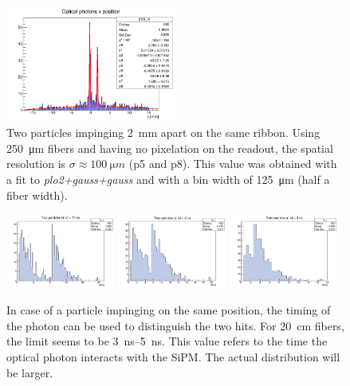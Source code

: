 \begin{refsection}
        \begin{figure}
            \centering
            \includegraphics[width=0.5\textwidth]{Figures/muEDM/Tracker/2mm.png}
            \caption{Two particles impinging \SI{2}{mm} apart on the same ribbon. Using \SI{250}{\micro m} fibers and having no pixelation on the readout, the spatial resolution is $\sigma\approx \SI{100}{\micro m}$ (p5 and p8). This value was obtained with a fit to \textit{plo2+gauss+gauss} and with a bin width of \SI{125}{\micro m} (half a fiber width).}
            \label{fig:geant4_position_resolution}
        \end{figure}
    
        

        \begin{figure}
            \centering
            \includegraphics[width=0.32\textwidth]{Figures/muEDM/Tracker/10ns.png}
            \includegraphics[width=0.32\textwidth]{Figures/muEDM/Tracker/5ns.png}
            \includegraphics[width=0.32\textwidth]{Figures/muEDM/Tracker/2ns.png}
            \caption{In case of a particle impinging on the same position, the timing of the photon can be used to distinguish the two hits. For \SI{20}{cm} fibers, the limit seems to be \SIrange{3}{5}{ns}. This value refers to the time the optical photon interacts with the SiPM. The actual distribution will be larger.}
            \label{fig:geant4_time}
        \end{figure}


\end{refsection}
